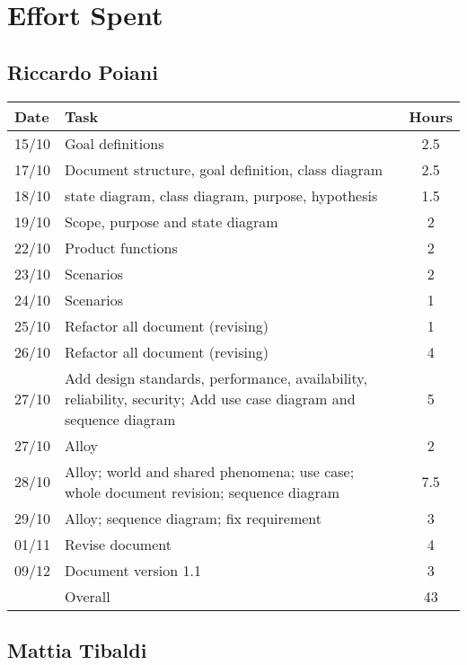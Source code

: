 
\section{Effort Spent}

\subsection{Riccardo Poiani}

\begin{table}[H]
\begin{tabularx}{\textwidth}{|l|X|c|}
\hline
\rowcolor[HTML]{C0C0C0} 
Date & Task & Hours\\ \hline
15/10 & Goal definitions & 2.5\\ \hline
17/10 & Document structure, goal definition, class diagram & 2.5\\ \hline
18/10 & state diagram, class diagram, purpose, hypothesis & 1.5\\ \hline
19/10 & Scope, purpose and state diagram & 2\\ \hline
22/10 & Product functions & 2\\ \hline
23/10 & Scenarios & 2\\ \hline
24/10 & Scenarios & 1\\ \hline
25/10 & Refactor all document (revising) & 1\\ \hline
26/10 & Refactor all document (revising) & 4\\ \hline
27/10 & Add design standards, performance, availability, reliability, security; Add use case diagram and sequence diagram & 5\\ \hline
27/10 & Alloy & 2\\ \hline
28/10 & Alloy; world and shared phenomena; use case; whole document revision; sequence diagram & 7.5  \\ \hline
29/10 & Alloy; sequence diagram; fix requirement& 3 \\ \hline
01/11 & Revise document & 4 \\ \hline 
09/12 & Document version 1.1 & 3\\ \hline
\rowcolor[HTML]{C0C0C0} 
& Overall & 43 \\ \hline
\end{tabularx}
\end{table}

\subsection{Mattia Tibaldi}


